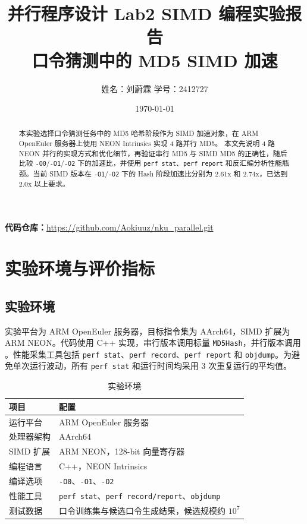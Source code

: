 \documentclass[UTF8,a4paper,12pt]{ctexart}
\title{并行程序设计 Lab2 SIMD 编程实验报告\\口令猜测中的 MD5 SIMD 加速}
\author{姓名：刘蔚霖 \quad 学号：2412727}
\date{\today}
\begin{document}
\maketitle
\thispagestyle{empty}
\tableofcontents
\thispagestyle{empty}
\newpage
{}
\setcounter{page}{1}
\pagestyle{plain}

\begin{abstract}
本实验选择口令猜测任务中的 MD5 哈希阶段作为 SIMD 加速对象，在 ARM OpenEuler 服务器上使用 NEON Intrinsics 实现 4 路并行 MD5。
本文先说明 4 路 NEON 并行的实现方式和优化细节，再验证串行 MD5 与 SIMD MD5 的正确性，随后比较 \texttt{-O0}/\texttt{-O1}/\texttt{-O2} 下的加速比，并使用 \texttt{perf stat}、\texttt{perf report} 和反汇编分析性能瓶颈。当前 SIMD 版本在 \texttt{-O1}/\texttt{-O2} 下的 Hash 阶段加速比分别为 2.61x 和 2.74x，已达到 2.0x 以上要求。
\end{abstract}

\noindent\textbf{代码仓库：}\url{https://github.com/Aokiuuz/nku_parallel.git}

\section{实验环境与评价指标}

\subsection{实验环境}

实验平台为 ARM OpenEuler 服务器，目标指令集为 AArch64，SIMD 扩展为 ARM NEON。代码使用 C++ 实现，串行版本调用标量 \texttt{MD5Hash}，并行版本调用 。性能采集工具包括 \texttt{perf stat}、\texttt{perf record}、\texttt{perf report} 和 \texttt{objdump}。为避免单次运行波动，所有 \texttt{perf stat} 和运行时间均采用 3 次重复运行的平均值。

\begin{table}[H]
    \centering
    \caption{实验环境}
    \begin{tabular}{ll}
        \toprule
        项目 & 配置 \\
        \midrule
        运行平台 & ARM OpenEuler 服务器 \\
        处理器架构 & AArch64 \\
        SIMD 扩展 & ARM NEON，128-bit 向量寄存器 \\
        编程语言 & C++，NEON Intrinsics \\
        编译选项 & \texttt{-O0}、\texttt{-O1}、\texttt{-O2} \\
        性能工具 & \texttt{perf stat}、\texttt{perf record/report}、\texttt{objdump} \\
        测试数据 & 口令训练集与候选口令生成结果，候选规模约 $10^7$ \\
        \bottomrule
    \end{tabular}
\end{table}
\end{document}
